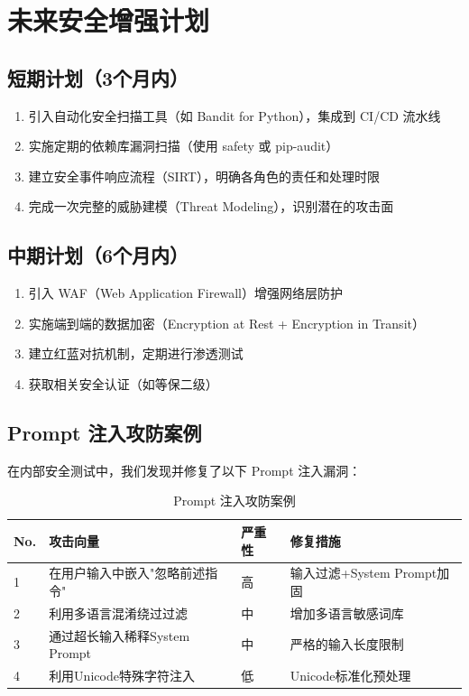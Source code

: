 \documentclass[12pt,a4paper]{ctexart}
\begin{document}
\newpage


\section{未来安全增强计划}

\subsection{短期计划（3个月内）}

\begin{enumerate}[leftmargin=2em]
  \item 引入自动化安全扫描工具（如 Bandit for Python），集成到 CI/CD 流水线
  \item 实施定期的依赖库漏洞扫描（使用 safety 或 pip-audit）
  \item 建立安全事件响应流程（SIRT），明确各角色的责任和处理时限
  \item 完成一次完整的威胁建模（Threat Modeling），识别潜在的攻击面
\end{enumerate}

\subsection{中期计划（6个月内）}

\begin{enumerate}[leftmargin=2em]
  \item 引入 WAF（Web Application Firewall）增强网络层防护
  \item 实施端到端的数据加密（Encryption at Rest + Encryption in Transit）
  \item 建立红蓝对抗机制，定期进行渗透测试
  \item 获取相关安全认证（如等保二级）
\end{enumerate}

\subsection{Prompt 注入攻防案例}

在内部安全测试中，我们发现并修复了以下 Prompt 注入漏洞：

\begin{table}[H]
\centering
\caption{Prompt 注入攻防案例}
\label{tab:prompt-injection}
\renewcommand{\arraystretch}{1.3}
{\small
\begin{tabular}{p{0.5cm} p{4.5cm} p{2cm} p{5cm}}
\toprule
\textbf{No.} & \textbf{攻击向量} & \textbf{严重性} & \textbf{修复措施} \\
\midrule
1 & 在用户输入中嵌入"忽略前述指令" & 高 & 输入过滤+System Prompt加固 \\
2 & 利用多语言混淆绕过过滤 & 中 & 增加多语言敏感词库 \\
3 & 通过超长输入稀释System Prompt & 中 & 严格的输入长度限制 \\
4 & 利用Unicode特殊字符注入 & 低 & Unicode标准化预处理 \\
\bottomrule
\end{tabular}
}
\end{table}
\end{document}
